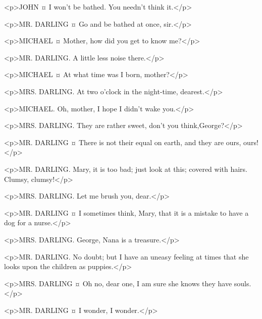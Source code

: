 <p>JOHN ¤
I won't be bathed. You needn't think it.</p>

<p>MR. DARLING ¤
Go and be bathed at once, sir.</p>


<p>MICHAEL ¤
Mother, how did you get to know me?</p>

<p>MR. DARLING. A little less noise there.</p>

<p>MICHAEL ¤
At what time was I born, mother?</p>

<p>MRS. DARLING. At two o'clock in the night-time, dearest.</p>

<p>MICHAEL. Oh, mother, I hope I didn't wake you.</p>

<p>MRS. DARLING. They are rather sweet, don't you think,George?</p>

<p>MR. DARLING ¤
There is not their equal on earth, and they are ours, ours!</p>


<p>MR. DARLING. Mary, it is too bad; just look at this; covered with hairs. Clumsy, clumsy!</p>


<p>MRS. DARLING. Let me brush you, dear.</p>


<p>MR. DARLING ¤
I sometimes think, Mary, that it is a mistake to have a dog for a nurse.</p>

<p>MRS. DARLING. George, Nana is a treasure.</p>

<p>MR. DARLING. No doubt; but I have an uneasy feeling at times that she looks upon the children as puppies.</p>

<p>MRS. DARLING ¤
Oh no, dear one, I am sure she knows they have souls.</p>

<p>MR. DARLING ¤
I wonder, I wonder.</p>


